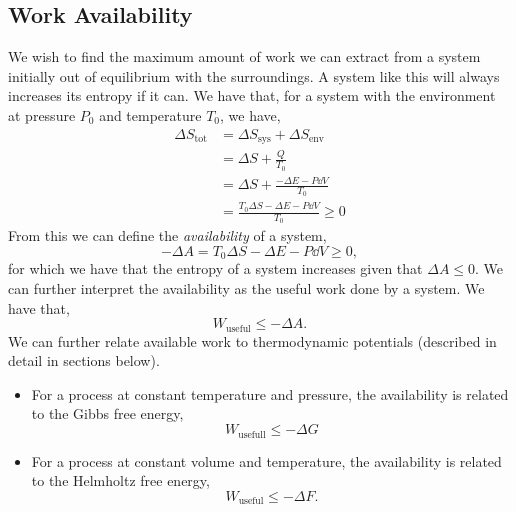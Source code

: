 \documentclass{book}
\begin{document}
\subsection{Work Availability}
We wish to find the maximum amount of work we can extract from a system initially out of equilibrium with the surroundings. A system like this will always increases its entropy if it can. We have that, for a system with the environment at pressure $P_0$ and temperature $T_0$, we have,
\begin{equation}
	\begin{split}
		\Delta S_{\text{tot}} & = \Delta S_{\text{sys}} + \Delta S_{\text{env}} \\
		& = \Delta S + \frac{Q}{T_0} \\
		& = \Delta S + \frac{-\Delta E - P\dd{V}}{T_0} \\
		& = \frac{T_0 \Delta S - \Delta E - P\dd{V}}{T_0} \geq 0
	\end{split}
\end{equation}
From this we can define the \textit{availability} of a system,
\begin{equation}
	- \Delta A = T_0 \Delta S - \Delta E - P\dd{V} \geq 0,
\end{equation}
for which we have that the entropy of a system increases given that $\Delta A \leq 0$. We can further interpret the availability as the useful work done by a system. We have that,
\begin{equation}
	\boxed{W_{\text{useful}} \leq -\Delta A}.
\end{equation}
We can further relate available work to thermodynamic potentials (described in detail in sections below).
\begin{itemize}
	\item For a process at constant temperature and pressure, the availability is related to the Gibbs free energy,
	\begin{equation}
		\boxed{W_{\text{usefull}} \leq -\Delta G}
	\end{equation}
	\item For a process at constant volume and temperature, the availability is related to the Helmholtz free energy,
	\begin{equation}
		\boxed{W_{\text{useful}} \leq -\Delta F}.
	\end{equation}
\end{itemize}
\end{document}
